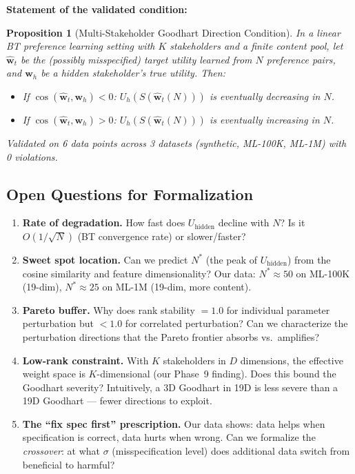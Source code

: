 \documentclass[11pt]{article}
\newtheorem{proposition}{Proposition}
\begin{document}
\textbf{Statement of the validated condition:}

\begin{proposition}[Multi-Stakeholder Goodhart Direction Condition]
\label{prop:direction}
In a linear BT preference learning setting with $K$ stakeholders and a
finite content pool, let $\hat{\mathbf{w}}_t$ be the (possibly
misspecified) target utility learned from $N$ preference pairs, and
$\mathbf{w}_h$ be a hidden stakeholder's true utility. Then:
\begin{itemize}
  \item If $\cos(\hat{\mathbf{w}}_t, \mathbf{w}_h) < 0$:
    $U_h(S(\hat{\mathbf{w}}_t(N)))$ is eventually decreasing in $N$.
  \item If $\cos(\hat{\mathbf{w}}_t, \mathbf{w}_h) > 0$:
    $U_h(S(\hat{\mathbf{w}}_t(N)))$ is eventually increasing in $N$.
\end{itemize}
Validated on 6 data points across 3 datasets (synthetic, ML-100K, ML-1M)
with 0 violations.
\end{proposition}

\subsection{Open Questions for Formalization}

\begin{enumerate}
  \item \textbf{Rate of degradation.} How fast does
    $U_{\text{hidden}}$ decline with $N$? Is it
    $O(1/\sqrt{N})$ (BT convergence rate) or slower/faster?

  \item \textbf{Sweet spot location.} Can we predict $N^*$ (the
    peak of $U_{\text{hidden}}$) from the cosine similarity and
    feature dimensionality? Our data: $N^* \approx 50$ on ML-100K
    (19-dim), $N^* \approx 25$ on ML-1M (19-dim, more content).

  \item \textbf{Pareto buffer.} Why does rank stability $= 1.0$ for
    individual parameter perturbation but $< 1.0$ for correlated
    perturbation? Can we characterize the perturbation directions
    that the Pareto frontier absorbs vs.\ amplifies?

  \item \textbf{Low-rank constraint.} With $K$ stakeholders in $D$
    dimensions, the effective weight space is $K$-dimensional
    (our Phase~9 finding). Does this bound the Goodhart severity?
    Intuitively, a 3D Goodhart in 19D is less severe than a 19D
    Goodhart --- fewer directions to exploit.

  \item \textbf{The ``fix spec first'' prescription.} Our data shows:
    data helps when specification is correct, data hurts when wrong.
    Can we formalize the \emph{crossover}: at what $\sigma$
    (misspecification level) does additional data switch from
    beneficial to harmful?
\end{enumerate}
\end{document}
